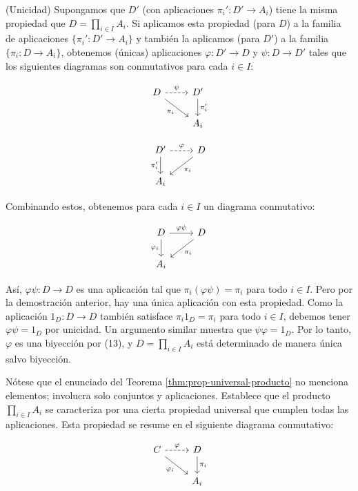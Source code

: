 (Unicidad) Supongamos que $D'$ (con aplicaciones $\pi_i': D' \to A_i$) tiene la misma propiedad que $D = \prod_{i \in I} A_i$. Si aplicamos esta propiedad (para $D$) a la familia de aplicaciones $\{\pi_i': D' \to A_i\}$ y también la aplicamos (para $D'$) a la familia $\{\pi_i: D \to A_i\}$, obtenemos (únicas) aplicaciones $\varphi: D' \to D$ y $\psi: D \to D'$ tales que los siguientes diagramas son conmutativos para cada $i \in I$:

\[
    \begin{tikzcd}
    D \arrow[swap]{dr}{\pi_i} \arrow[dashed]{r}{\psi} & D' \arrow{d}{\pi_i'} \\
    & A_i
    \end{tikzcd}
\]

\[
    \begin{tikzcd}
    D' \arrow[swap]{d}{\pi_i'} \arrow[dashed]{r}{\varphi} & D \arrow{dl}{\pi_i} \\
    A_i
    \end{tikzcd}
\]

Combinando estos, obtenemos para cada $i \in I$ un diagrama conmutativo:

\[
    \begin{tikzcd}
    D \arrow[swap]{d}{\varphi_i} \arrow{r}{\varphi \psi} & D \arrow{dl}{\pi_i} \\
    A_i
    \end{tikzcd}
\]

Así, $\varphi \psi: D \to D$ es una aplicación tal que $\pi_i (\varphi \psi) = \pi_i$ para todo $i \in I$. Pero por la demostración anterior, hay una única aplicación con esta propiedad. Como la aplicación $1_D: D \to D$ también satisface $\pi_i 1_D = \pi_i$ para todo $i \in I$, debemos tener $\varphi \psi = 1_D$ por unicidad. Un argumento similar muestra que $\psi \varphi = 1_D$. Por lo tanto, $\varphi$ es una biyección por (13), y $D = \prod_{i \in I} A_i$ está determinado de manera única salvo biyección.

Nótese que el enunciado del Teorema \ref{thm:prop-universal-producto} no menciona elementos; involucra solo conjuntos y aplicaciones. Establece que el producto $\prod_{i \in I} A_i$ se caracteriza por una cierta propiedad universal que cumplen todas las aplicaciones. Esta propiedad se resume en el siguiente diagrama conmutativo:

\[
    \begin{tikzcd}
    C \arrow[swap]{dr}{\varphi_i} \arrow[dashed]{r}{\varphi} & D \arrow{d}{\pi_i} \\
    & A_i
    \end{tikzcd}
\]